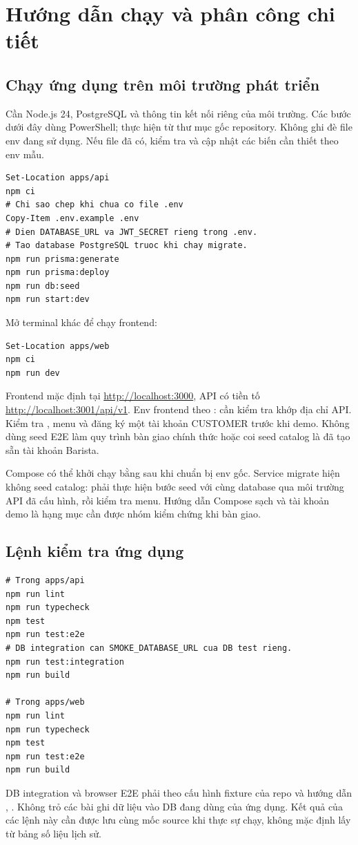 \chapter{Hướng dẫn chạy và phân công chi tiết}
\label{chap:phu-luc}

\section{Chạy ứng dụng trên môi trường phát triển}
Cần Node.js 24, PostgreSQL và thông tin kết nối riêng của môi trường.
Các bước dưới đây dùng PowerShell; thực hiện từ thư mục gốc repository.
Không ghi đè file env đang sử dụng. Nếu file đã có, kiểm tra và cập nhật
các biến cần thiết theo env mẫu.

\begin{lstlisting}[caption={Chuẩn bị backend và dữ liệu menu}]
Set-Location apps/api
npm ci
# Chi sao chep khi chua co file .env
Copy-Item .env.example .env
# Dien DATABASE_URL va JWT_SECRET rieng trong .env.
# Tao database PostgreSQL truoc khi chay migrate.
npm run prisma:generate
npm run prisma:deploy
npm run db:seed
npm run start:dev
\end{lstlisting}
Mở terminal khác để chạy frontend:
\begin{lstlisting}[caption={Chạy frontend từ gốc repository}]
Set-Location apps/web
npm ci
npm run dev
\end{lstlisting}
Frontend mặc định tại \url{http://localhost:3000}, API có tiền tố
\url{http://localhost:3001/api/v1}. Env frontend theo
: cần kiểm tra  khớp
địa chỉ API. Kiểm tra , menu và đăng ký một tài khoản
CUSTOMER trước khi demo. Không dùng seed E2E làm quy trình bàn giao
chính thức hoặc coi seed catalog là đã tạo sẵn tài khoản Barista.

Compose có thể khởi chạy bằng  sau khi
chuẩn bị env gốc. Service migrate hiện không seed catalog: phải thực
hiện bước seed với cùng database qua môi trường API đã cấu hình, rồi
kiểm tra menu. Hướng dẫn Compose sạch và tài khoản demo là hạng mục
cần được nhóm kiểm chứng khi bàn giao.

\section{Lệnh kiểm tra ứng dụng}
\begin{lstlisting}[caption={Các lệnh kiểm tra dùng trong từng ứng dụng}]
# Trong apps/api
npm run lint
npm run typecheck
npm test
npm run test:e2e
# DB integration can SMOKE_DATABASE_URL cua DB test rieng.
npm run test:integration
npm run build

# Trong apps/web
npm run lint
npm run typecheck
npm test
npm run test:e2e
npm run build
\end{lstlisting}
DB integration và browser E2E phải theo cấu hình fixture của repo và
hướng dẫn ,
. Không trỏ các bài ghi dữ liệu vào DB
đang dùng của ứng dụng. Kết quả của các lệnh này cần được lưu cùng mốc
source khi thực sự chạy, không mặc định lấy từ bảng số liệu lịch sử.

